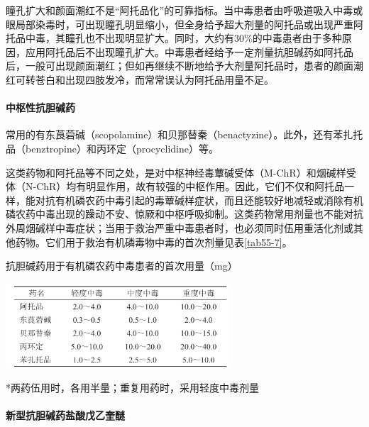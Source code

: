 瞳孔扩大和颜面潮红不是“阿托品化”的可靠指标。当中毒患者由呼吸道吸入中毒或眼局部染毒时，可出现瞳孔明显缩小，但全身给予超大剂量的阿托品或出现严重阿托品中毒，其瞳孔也不出现明显扩大。同时，大约有30\%的中毒患者由于多种原因，应用阿托品后不出现瞳孔扩大。中毒患者经给予一定剂量抗胆碱药如阿托品后，一般可出现颜面潮红；但如再继续不断地给予大剂量阿托品时，患者的颜面潮红可转苍白和出现四肢发冷，而常常误认为阿托品用量不足。

\paragraph{中枢性抗胆碱药}

常用的有东莨菪碱（scopolamine）和贝那替秦（benactyzine）。此外，还有苯扎托品（benztropine）和丙环定（procyclidine）等。

这类药物和阿托品等不同之处，是对中枢神经毒蕈碱受体（M-ChR）和烟碱样受体（N-ChR）均有明显作用，故有较强的中枢作用。因此，它们不仅和阿托品一样，能对抗有机磷农药中毒引起的毒蕈碱样症状，而且还能较好地减轻或消除有机磷农药中毒出现的躁动不安、惊厥和中枢呼吸抑制。这类药物常用剂量也不能对抗外周烟碱样中毒症状；当用于救治严重中毒患者时，也必须同时伍用重活化剂或其他药物。它们用于救治有机磷毒物中毒的首次剂量见表\ref{tab55-7}。

\begin{table}[htbp]
\centering
\caption{抗胆碱药用于有机磷农药中毒患者的首次用量（mg）}
\label{tab55-7}
\includegraphics[width=3.27083in,height=1.25in]{./images/Image00209.jpg}
\end{table}

*两药伍用时，各用半量；重复用药时，采用轻度中毒剂量

\paragraph{新型抗胆碱药盐酸戊乙奎醚}

